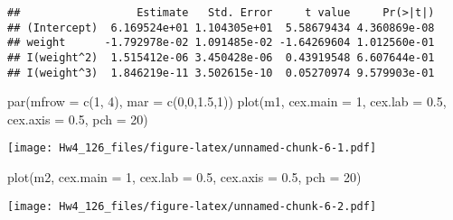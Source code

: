 \documentclass[
]{article}
\newenvironment{Shaded}{\begin{snugshade}}{\end{snugshade}}
\newcommand{\AttributeTok}[1]{\textcolor[rgb]{0.77,0.63,0.00}{#1}}
\newcommand{\DecValTok}[1]{\textcolor[rgb]{0.00,0.00,0.81}{#1}}
\newcommand{\FloatTok}[1]{\textcolor[rgb]{0.00,0.00,0.81}{#1}}
\newcommand{\FunctionTok}[1]{\textcolor[rgb]{0.00,0.00,0.00}{#1}}
\newcommand{\NormalTok}[1]{#1}
\newcommand{\OtherTok}[1]{\textcolor[rgb]{0.56,0.35,0.01}{#1}}
\newcommand{\SpecialCharTok}[1]{\textcolor[rgb]{0.00,0.00,0.00}{#1}}
\begin{document}
\begin{Shaded}
\end{Shaded}

\begin{verbatim}
##                  Estimate   Std. Error     t value     Pr(>|t|)
## (Intercept)  6.169524e+01 1.104305e+01  5.58679434 4.360869e-08
## weight      -1.792978e-02 1.091485e-02 -1.64269604 1.012560e-01
## I(weight^2)  1.515412e-06 3.450428e-06  0.43919548 6.607644e-01
## I(weight^3)  1.846219e-11 3.502615e-10  0.05270974 9.579903e-01
\end{verbatim}

\begin{Shaded}
\begin{Highlighting}[]
\FunctionTok{par}\NormalTok{(}\AttributeTok{mfrow =} \FunctionTok{c}\NormalTok{(}\DecValTok{1}\NormalTok{, }\DecValTok{4}\NormalTok{), }\AttributeTok{mar =} \FunctionTok{c}\NormalTok{(}\DecValTok{0}\NormalTok{,}\DecValTok{0}\NormalTok{,}\FloatTok{1.5}\NormalTok{,}\DecValTok{1}\NormalTok{))}
\FunctionTok{plot}\NormalTok{(m1, }\AttributeTok{cex.main =} \DecValTok{1}\NormalTok{, }\AttributeTok{cex.lab =} \FloatTok{0.5}\NormalTok{, }\AttributeTok{cex.axis =} \FloatTok{0.5}\NormalTok{, }\AttributeTok{pch =} \DecValTok{20}\NormalTok{)}
\end{Highlighting}
\end{Shaded}

\texttt{[image: Hw4\_126\_files/figure-latex/unnamed-chunk-6-1.pdf]}

\begin{Shaded}
\begin{Highlighting}[]
\FunctionTok{plot}\NormalTok{(m2, }\AttributeTok{cex.main =} \DecValTok{1}\NormalTok{, }\AttributeTok{cex.lab =} \FloatTok{0.5}\NormalTok{, }\AttributeTok{cex.axis =} \FloatTok{0.5}\NormalTok{, }\AttributeTok{pch =} \DecValTok{20}\NormalTok{)}
\end{Highlighting}
\end{Shaded}

\texttt{[image: Hw4\_126\_files/figure-latex/unnamed-chunk-6-2.pdf]}
\end{document}
